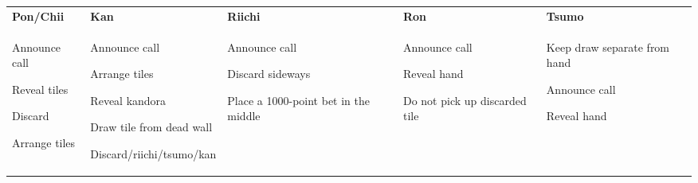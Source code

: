 \begin{tabularx}{\linewidth}{XXXXX}
  {\large\bfseries Pon/Chii} & {\large\bfseries Kan} & {\large\bfseries Riichi} & {\large\bfseries Ron} & {\large\bfseries Tsumo}\\
  \begin{callprocedure}
    \item Announce call
    \item Reveal tiles
    \item Discard
    \item Arrange tiles
  \end{callprocedure} &
  \begin{callprocedure}
    \item Announce call
    \item Arrange tiles
    \item Reveal kandora
    \item Draw tile from dead wall
    \item Discard/\linebreak[0]riichi/\linebreak[0]tsumo/\linebreak[0]kan
  \end{callprocedure} &
  \begin{callprocedure}
    \item Announce call
    \item Discard sideways
    \item Place a 1000-point bet in the middle
  \end{callprocedure} &
  \begin{callprocedure}
    \item Announce call
    \item Reveal hand
    \item Do not pick up discarded tile
  \end{callprocedure} &
  \begin{callprocedure}
  \item Keep draw separate from hand
  \item Announce call
  \item Reveal hand
  \end{callprocedure}

\end{tabularx}
